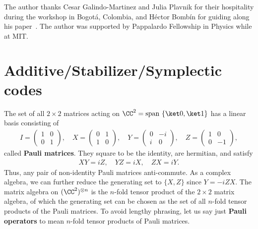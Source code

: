 The author thanks
Cesar Galindo-Martinez and Julia Plavnik
for their hospitality during the workshop in Bogot\'a, Colombia,
and H\'ector Bomb\'in for guiding along his paper~\cite{Bombin2011Structure}.
The author was supported by Pappalardo Fellowship in Physics while at MIT.

\section{Additive/Stabilizer/Symplectic codes}

The set of all $2 \times 2$ matrices acting on $\CC^2 = \mathrm{span}~\{ \ket 0, \ket 1 \}$
has a linear basis consisting of
\begin{align}
 I = \begin{pmatrix} 1 & 0 \\ 0 & 1 \end{pmatrix}, \quad
 X = \begin{pmatrix} 0 & 1 \\ 1 & 0 \end{pmatrix}, \quad 
 Y = \begin{pmatrix} 0 & -i \\ i & 0 \end{pmatrix}, \quad
 Z = \begin{pmatrix} 1 & 0 \\ 0 & -1 \end{pmatrix},
\end{align}
called {\bf Pauli matrices}. They square to be the identity, are hermitian, and satisfy
\begin{align}
 XY = iZ,\quad YZ = iX,\quad ZX = iY.
\end{align}
Thus, any pair of non-identity Pauli matrices anti-commute.
As a complex algebra, we can further reduce the generating set to $\{X,Z\}$ since $Y = -iZX$.
The matrix algebra on $(\CC^2)^{\otimes n}$ is the $n$-fold tensor product of the
$2 \times 2$ matrix algebra, of which the generating set can be chosen as
the set of all $n$-fold tensor products of the Pauli matrices.
To avoid lengthy phrasing, let us say just {\bf Pauli operators} 
to mean $n$-fold tensor products of Pauli matrices.


